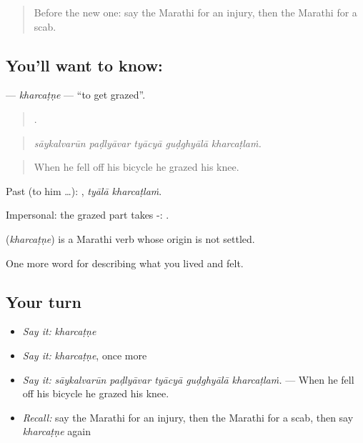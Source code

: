 \label{lesson:MR-C486-kharcatne}



\begin{quote}
Before the new one: say the Marathi for an injury, then the Marathi for a scab.
\end{quote}

\subsection*{You'll want to know: }
\textbf{} — \emph{kharcaṭṇe} — \textquotedblleft{}to get grazed\textquotedblright{}.

\begin{quote}
    .
\end{quote}

\begin{quote}
\emph{sāykalvarūn paḍlyāvar tyācyā guḍghyālā kharcaṭlaṁ.}
\end{quote}

\begin{quote}
When he fell off his bicycle he grazed his knee.
\end{quote}

Past (to him …):  , \emph{tyālā kharcaṭlaṁ}.

Impersonal: the grazed part takes -:  .

\begin{cousinweb}
\textbf{} (\emph{kharcaṭṇe}) is a Marathi verb whose origin is not settled.
\end{cousinweb}

\begin{grammarlens}[title={What you've built}]
One more word for describing what you lived and felt.
\end{grammarlens}

\subsection*{Your turn}
\begin{itemize}
\raggedright
  \item \emph{Say it:} \emph{kharcaṭṇe}
  \item \emph{Say it:} \emph{kharcaṭṇe}, once more
  \item \emph{Say it:} \emph{sāykalvarūn paḍlyāvar tyācyā guḍghyālā kharcaṭlaṁ.} — When he fell off his bicycle he grazed his knee.
  \item \emph{Recall:} say the Marathi for an injury, then the Marathi for a scab, then say \emph{kharcaṭṇe} again
\end{itemize}


